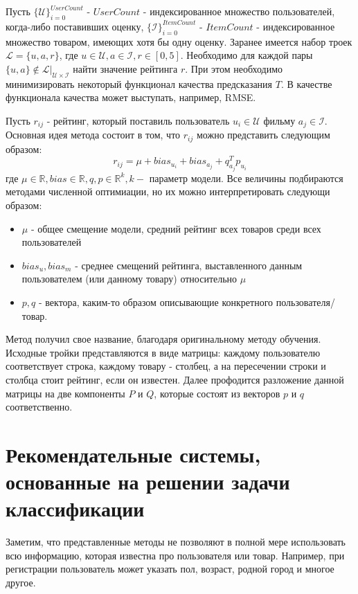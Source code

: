 \documentclass[12pt,a4paper]{report}
\begin{document}
Пусть $\{\mathcal{U}\}_{i=0}^{UserCount}$ - $UserCount$ - индексированное множество пользователей, когда-либо поставивших оценку, $\{\mathcal{I}\}_{i=0}^{ItemCount}$ - $ItemCount$ - индексированное множество товаром, имеющих хотя бы одну оценку. Заранее имеется набор троек $\mathcal{L} = \{u, a, r\}$, где $u \in \mathcal{U}, a \in \mathcal{I}, r \in [0, 5]$. Необходимо для каждой пары $\{u,a\} \notin \mathcal{L|_{\mathcal{U}\times\mathcal{I}}}$ найти значение рейтинга $r$. При этом необходимо минимизировать некоторый функционал качества предсказания $T$. В качестве функционала качества может выступать, например, RMSE.

Пусть $r_{ij}$ - рейтинг, который поставиль пользователь $u_i \in \mathcal{U}$ фильму $a_j \in \mathcal{I}$. Основная идея метода состоит в том, что $r_{ij}$ можно представить следующим образом:
\begin{equation*}
r_{ij} = \mu + bias_{u_i} + bias_{a_j} + q_{a_j}^Tp_{u_i}
\end{equation*}
где $\mu \in \mathbb{R}, bias \in \mathbb{R}, q,p \in \mathbb{R}^k, k - $ параметр модели.
Все величины подбираются методами численной оптимиации, но их можно интерпретировать следующи образом:
\begin{itemize}
\item $\mu$ - общее смещение модели, средний рейтинг всех товаров среди всех пользователей
\item $bias_u, bias_m$ - среднее смещений рейтинга, выставленного данным пользователем (или данному товару) относительно $\mu$
\item $p, q$ - вектора, каким-то образом описывающие конкретного пользователя/товар.
\end{itemize}

Метод получил свое название, благодаря оригинальному методу обучения. Исходные тройки представляются в виде матрицы: каждому пользователю соответствует строка, каждому товару - столбец, а на пересечении строки и столбца стоит рейтинг, если он известен. Далее профодится разложение данной матрицы на две компоненты $P$ и $Q$, которые состоят из векторов $p$ и $q$ соответственно.

\section{Рекомендательные системы, основанные на решении задачи классификации}
Заметим, что представленные методы не позволяют в полной мере использовать всю информацию, которая известна про пользователя или товар. Например, при регистрации пользователь может указать пол, возраст, родной город и многое другое.
\end{document}
